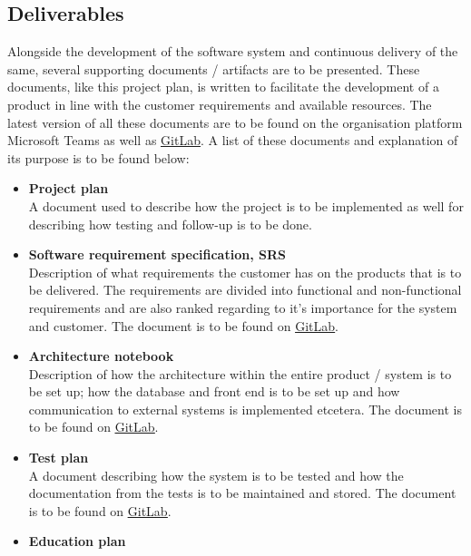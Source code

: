 \subsection{Deliverables}
Alongside the development of the software system and continuous delivery of the same, several supporting documents / artifacts are to be presented. These documents, like this project plan, is written to facilitate the development of a product in line with the customer requirements and available resources. The latest version of all these documents are to be found on the organisation platform Microsoft Teams as well as   \href{https://gitlab.liu.se/tddc88-company-3-2020/deploy}{\underline{GitLab}}. A list of these documents and explanation of its purpose is to be found below:
\begin{itemize}
    \item{\textbf{Project plan}} \\
    A document used to describe how the project is to be implemented as well for describing how testing and follow-up is to be done. 
    \item{\textbf{Software requirement specification, SRS}} \\
    Description of what requirements the customer has on the products that is to be delivered. The requirements are divided into functional and non-functional requirements and are also ranked regarding to it's importance for the system and customer. The document is to be found on \href{https://gitlab.liu.se/tddc88-company-3-2020/deploy/-/tree/Document_branch/Software%20Requirements%20Specification}{\underline{GitLab}}.
    \item{\textbf{Architecture notebook}} \\
    Description of how the architecture within the entire product / system is to be set up; how the database and front end is to be set up and how communication to external systems is implemented etcetera. The document is to be found on \href{https://gitlab.liu.se/tddc88-company-3-2020/deploy/-/tree/Document_branch/Architecture%20Notebook}{\underline{GitLab}}.  
    \item{\textbf{Test plan}} \\
    A document describing how the system is to be tested and how the documentation from the tests is to be maintained and stored. The document is to be found on \href{https://gitlab.liu.se/tddc88-company-3-2020/deploy/-/tree/Document_branch/Test_Plan}{\underline{GitLab}}.
    \item{\textbf{Education plan}} \\

\end{itemize}
